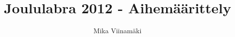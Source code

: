 \documentclass{article}
\begin{document}
\title{Joululabra 2012 - Aihemäärittely}
\author{Mika Viinamäki}
\maketitle
\end{document}
